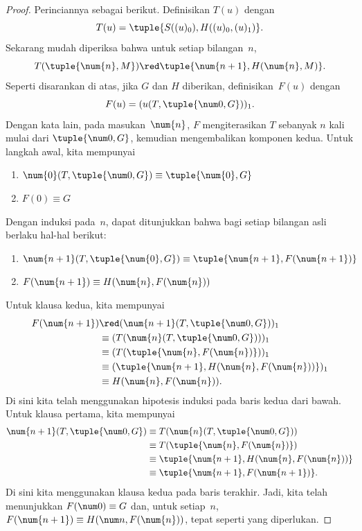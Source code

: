 \documentclass[../../../include/open-logic-section]{subfiles}
\begin{document}
\begin{proof}
Perinciannya sebagai berikut. Definisikan $T(u)$ dengan
\[
T(u) = \tuple{S((u)_0), H((u)_0,(u)_1)}.
\]
Sekarang mudah diperiksa bahwa untuk setiap bilangan~$n$,
\[
T(\tuple{\num{n}, M}) \red \tuple{\num{n+1}, H(\num{n}, M)}.
\]
Seperti disarankan di atas, jika $G$ dan $H$ diberikan, definisikan~$F(u)$
dengan
\[
F(u) = (u(T,\tuple{\num 0, G}))_1.
\]
Dengan kata lain, pada masukan~$\num{n}$, $F$ mengiterasikan $T$ sebanyak $n$
kali mulai dari $\tuple{\num 0,G}$, kemudian mengembalikan komponen kedua.
Untuk langkah awal, kita mempunyai
\begin{enumerate}
\item $\num{0} (T, \tuple{\num 0, G}) \equiv \tuple{\num{0}, G}$
\item $F(\num{0}) \equiv G$
\end{enumerate}
Dengan induksi pada~$n$, dapat ditunjukkan bahwa bagi setiap bilangan asli
berlaku hal-hal berikut:
\begin{enumerate}
\item $\num{n+1}(T, \tuple{\num{0}, G}) \equiv \tuple{\num{n+1}, F(\num{n+1})}$
\item $F(\num{n+1}) \equiv H(\num{n}, F(\num{n}))$
\end{enumerate}
Untuk klausa kedua, kita mempunyai
\begin{align*}
F(\num{n+1}) & \red (\num{n+1}(T, \tuple{\num 0, G}))_1 \\
& \equiv (T(\num{n} (T, \tuple{\num 0, G})))_1 \\
& \equiv (T(\tuple{\num{n}, F(\num{n})}))_1 \\
& \equiv (\tuple{\num{n+1}, H(\num{n}, F(\num{n}))})_1 \\
& \equiv H(\num{n}, F(\num{n})).
\end{align*}
Di sini kita telah menggunakan hipotesis induksi pada baris kedua dari bawah.
Untuk klausa pertama, kita mempunyai
\begin{align*}
\num{n+1} (T, \tuple{\num 0, G}) &
\equiv T(\num{n} (T, \tuple{\num 0, G})) \\
& \equiv T( \tuple{\num{n}, F(\num{n})}) \\
& \equiv \tuple{\num{n+1}, H(\num{n}, F(\num{n}))} \\
& \equiv \tuple{\num{n+1}, F(\num{n+1})}.
\end{align*}
Di sini kita menggunakan klausa kedua pada baris terakhir. Jadi, kita telah
menunjukkan $F(\num 0)\equiv G$ dan, untuk setiap~$n$,
$F(\num {n+1})\equiv H(\num n,F(\num{n}))$, tepat seperti yang diperlukan.
\end{proof}
\end{document}
